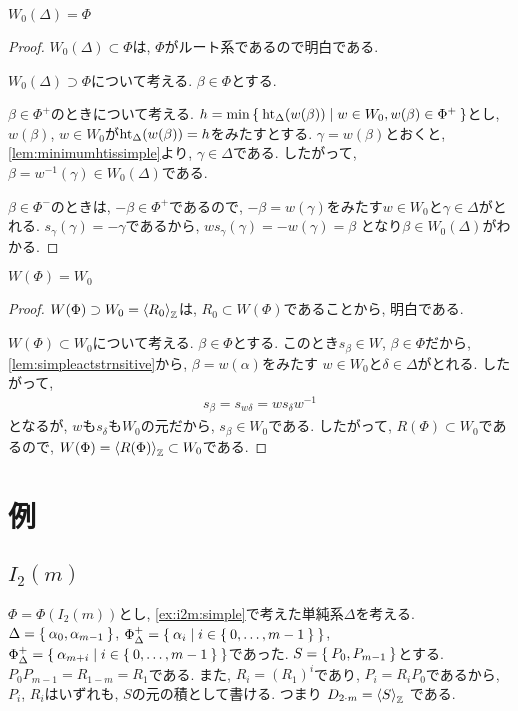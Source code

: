 \begin{lemma}
  \label{lem:simpleactstrnsitive}
  $W_0(\Delta)=\Phi$
\end{lemma}
\begin{proof}
  $W_0(\Delta)\subset \Phi$は, $\Phi$がルート系であるので明白である.

  $W_0(\Delta)\supset \Phi$について考える.
  $\beta\in \Phi$とする.

  $\beta\in\Phi^+$のときについて考える.
  $h=\min\Set{\operatorname{ht}_\Delta(w(\beta))|w\in W_0,w(\beta)\in\Phi^+}$とし,
  $w(\beta)$, $w\in W_0$が$\operatorname{ht}_\Delta(w(\beta))=h$をみたすとする.
  $\gamma=w(\beta)$とおくと,
  \cref{lem:minimumhtissimple}より,
  $\gamma\in\Delta$である.
  したがって, $\beta=w^{-1}(\gamma)\in W_0(\Delta)$である.

  $\beta\in\Phi^-$のときは, $-\beta\in\Phi^+$であるので,
  $-\beta=w(\gamma)$をみたす$w\in W_0$と$\gamma\in\Delta$がとれる.
  $s_\gamma(\gamma)=-\gamma$であるから,
  $ws_\gamma(\gamma)=-w(\gamma)=\beta$
  となり$\beta\in W_0(\Delta)$がわかる.
\end{proof}


\begin{theorem}
  $W(\Phi)=W_0$
\end{theorem}
\begin{proof}
  $W(\Phi)\supset W_0=\Braket{R_0}_{\mathbb{Z}}$は,
  $R_0\subset W(\Phi)$であることから,
  明白である.

  $W(\Phi)\subset W_0$について考える.
  $\beta\in\Phi$とする.
  このとき$s_\beta\in W$, $\beta\in\Phi$だから,
  \cref{lem:simpleactstrnsitive}から,
  $\beta=w(\alpha)$をみたす
  $w\in W_0$と$\delta\in\Delta$がとれる.
  したがって,
  \begin{align*}
    s_\beta=s_{w\delta}=ws_\delta w^{-1}
  \end{align*}
  となるが, $w$も$s_\delta$も$W_0$の元だから,
  $s_\beta\in W_0$である.
  したがって, $R(\Phi)\subset W_0$であるので,
  $W(\Phi)=\Braket{R(\Phi)}_{\mathbb{Z}}\subset W_0$である.
\end{proof}


\section{例}

\subsection{$I_2(m)$}
$\Phi=\Phi(I_2(m))$とし,
\cref{ex:i2m:simple}で考えた単純系$\Delta$を考える.
$\Delta=\Set{\alpha_0,\alpha_{m-1}}$,
$\Phi_\Delta^+=\Set{\alpha_i|i\in\Set{0,\ldots,m-1}}$,
$\Phi_\Delta^+=\Set{\alpha_{m+i}|i\in\Set{0,\ldots,m-1}}$であった.
$S=\Set{P_0,P_{m-1}}$とする.
$P_0P_{m-1}=R_{1-m}=R_1$である.
また, $R_i=(R_1)^i$であり, $P_i=R_iP_0$であるから,
$P_i$, $R_i$はいずれも, $S$の元の積として書ける.
つまり
$D_{2\cdot m}=\Braket{S}_{\mathbb{Z}}$
である.

